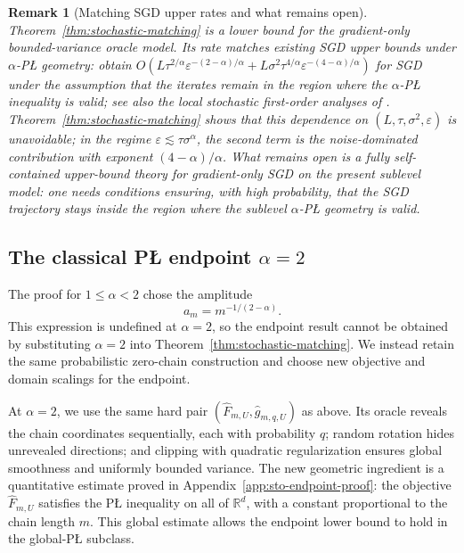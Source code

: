 \documentclass[11pt]{article}
\newtheorem{remark}[theorem]{Remark}
\newcommand{\R}{\mathbb{R}}
\begin{document}
\begin{remark}[Matching SGD upper rates and what remains open]
\label{rem:stochastic-upper-main}
Theorem~\ref{thm:stochastic-matching} is a lower bound for the gradient-only bounded-variance oracle model. Its rate
matches existing SGD upper bounds under \(\alpha\)-P\L{} geometry:
\citet{FatkhullinEtesamiHeKiyavash2022} obtain $O\left(
L\tau^{2/\alpha}\varepsilon^{-(2-\alpha)/\alpha}
 +
L\sigma^2\tau^{4/\alpha}\varepsilon^{-(4-\alpha)/\alpha}
\right)$ for SGD under the assumption that the iterates remain in the region where the \(\alpha\)-P\L{}
inequality is valid; see also the local stochastic first-order analyses of
\citet{MasihaSalehkaleybarHeKiyavash2022,MasihaSalehkaleybarHeKiyavashThiran2026}.
Theorem~\ref{thm:stochastic-matching} shows that this dependence on
\((L,\tau,\sigma^2,\varepsilon)\) is unavoidable; in the regime
\(\varepsilon\lesssim\tau\sigma^\alpha\), the second term is the noise-dominated contribution with exponent
\((4-\alpha)/\alpha\). What remains open is a fully self-contained upper-bound theory for
gradient-only SGD on the present sublevel model: one needs conditions ensuring, with high probability, that the SGD trajectory stays inside the region where the sublevel \(\alpha\)-P\L{} geometry is valid.
\end{remark}


\subsection{The classical P\L{} endpoint \texorpdfstring{\(\alpha=2\)}{alpha = 2}}
\label{sec:sto-endpoint}

The proof for \(1\le\alpha<2\) chose the amplitude
\[
a_m=m^{-1/(2-\alpha)}.
\]
This expression is undefined at \(\alpha=2\), so the endpoint result cannot be obtained by substituting
\(\alpha=2\) into Theorem~\ref{thm:stochastic-matching}. We instead retain the same probabilistic zero-chain
construction and choose new objective and domain scalings for the endpoint.


At \(\alpha=2\), we use the same hard pair \((\widehat F_{m,U},\widehat g_{m,q,U})\) as above. Its oracle reveals
the chain coordinates sequentially, each with probability \(q\); random rotation hides unrevealed directions; and
clipping with quadratic regularization ensures global smoothness and uniformly bounded variance. The new geometric
ingredient is a quantitative estimate proved in Appendix~\ref{app:sto-endpoint-proof}: the objective
\(\widehat F_{m,U}\) satisfies the P\L{} inequality on all of \(\R^d\), with a constant proportional to the chain
length \(m\). This global estimate allows the endpoint lower bound to hold in the global-P\L{} subclass.
\end{document}
